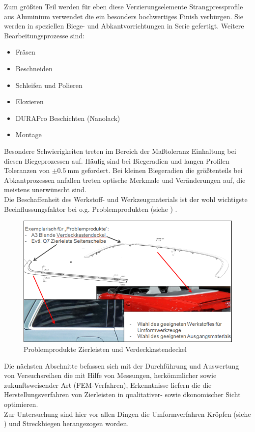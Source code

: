\documentclass[12pt,a4paper,parskip]{scrartcl}
\begin{document}
Zum größten Teil werden für eben diese Verzierungselemente
Strangpressprofile aus Aluminium verwendet die ein besonders hochwertiges Finish verbürgen. Sie werden in speziellen Biege- und Abkantvorrichtungen in Serie gefertigt.
 Weitere Bearbeitungsprozesse sind: \begin{itemize}
 \item Fräsen
 \item Beschneiden
 \item Schleifen und Polieren
 \item Eloxieren
 \item DURAPro Beschichten (Nanolack)
 \item Montage
 \end{itemize}
   Besondere Schwierigkeiten treten im Bereich der Maßtoleranz Einhaltung bei diesen Biegeprozessen auf. Häufig sind bei  Biegeradien und langen Profilen Toleranzen von $\pm \SI{0.5}{\milli\meter}$ gefordert. Bei kleinen Biegeradien die größtenteils bei Abkantprozessen anfallen treten optische Merkmale und Veränderungen auf, die meistens unerwünscht sind.\\
 Die Beschaffenheit des Werkstoff- und Werkzeugmaterials ist der wohl wichtigste Beeinflussungsfaktor bei o.g. Problemprodukten (siehe ) .
 \begin{figure}[!htb]
 \centering
 \includegraphics[width=.5\linewidth,height=.2\textheight]{ZierleisteVerdeckklappendeckel}
 \caption{Problemprodukte Zierleisten und Verdeckkastendeckel}
 \label{fig:Verdeckkastendeckel}
 \end{figure}

Die nächsten Abschnitte befassen sich mit der Durchführung und Auswertung von Versuchsreihen die mit Hilfe von Messungen, herkömmlicher sowie zukunftsweisender Art (FEM-Verfahren), Erkenntnisse liefern  die die Herstellungsverfahren von Zierleisten  in qualitativer- sowie ökonomischer Sicht  optimieren.\\
Zur Untersuchung   sind hier vor allen Dingen die Umformverfahren  Kröpfen (siehe )  und Streckbiegen herangezogen worden. 
\end{document}
